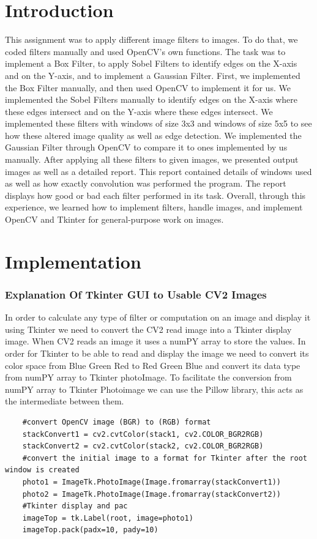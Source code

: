 \chapter{Introduction}

This assignment was to apply different image filters to images. To do that, we coded filters manually and used OpenCV's own functions. The task was to implement a Box Filter, to apply Sobel Filters to identify edges on the X-axis and on the Y-axis, and to implement a Gaussian Filter. First, we implemented the Box Filter manually, and then used OpenCV to implement it for us. We implemented the Sobel Filters manually to identify edges on the X-axis where these edges intersect and on the Y-axis where these edges intersect. We implemented these filters with windows of size 3x3 and windows of size 5x5 to see how these altered image quality as well as edge detection. We implemented the Gaussian Filter through OpenCV to compare it to ones implemented by us manually. After applying all these filters to given images, we presented output images as well as a detailed report. This report contained details of windows used as well as how exactly convolution was performed the program. The report displays how good or bad each filter performed in its task. Overall, through this experience, we learned how to implement filters, handle images, and implement OpenCV and Tkinter for general-purpose work on images.

\chapter{Implementation}
\subsection{Explanation Of Tkinter GUI to Usable CV2 Images}
In order to calculate any type of filter or computation on an image and display it using Tkinter we need to convert the CV2 read image into a Tkinter display image. When CV2 reads an image it uses a numPY array to store the values. In order for Tkinter to be able to read and display the image we need to convert its color space from Blue Green Red to Red Green Blue and convert its data type from numPY array to Tkinter photoImage. To facilitate the conversion from numPY array to Tkinter Photoimage we can use the Pillow library, this acts as the intermediate between them.
\begin{verbatim}
    #convert OpenCV image (BGR) to (RGB) format
    stackConvert1 = cv2.cvtColor(stack1, cv2.COLOR_BGR2RGB)
    stackConvert2 = cv2.cvtColor(stack2, cv2.COLOR_BGR2RGB)
    #convert the initial image to a format for Tkinter after the root window is created
    photo1 = ImageTk.PhotoImage(Image.fromarray(stackConvert1))
    photo2 = ImageTk.PhotoImage(Image.fromarray(stackConvert2))
    #Tkinter display and pac
    imageTop = tk.Label(root, image=photo1)
    imageTop.pack(padx=10, pady=10)
\end{verbatim}
